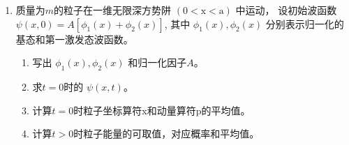 
\begin{enumerate}
	\item
	质量为$ m $的粒子在一维无限深方势阱 $(0<\mathrm{x}<\mathrm{a})$ 中运动， 设初始波函数 $\psi(x, 0)=A\left[\phi_{1}(x)+\phi_{2}(x)\right]$, 其中 $\phi_{1}(x), \phi_{2}(x)$ 分别表示归一化的基态和第一激发态波函数。
	\begin{enumerate}
		\item
		写出 $\phi_{1}(x), \phi_{2}(x)$ 和归一化因子$ A $。
		\item 
		求$ t=0 $时的 $\psi(x, t)$。
		\item 
		计算$ t=0 $时粒子坐标算符x和动量算符p的平均值。
		\item 
		计算$ t>0 $时粒子能量的可取值，对应概率和平均值。
		
		
		
	\end{enumerate}
	
	\banswer{
		
	}
	

\end{enumerate}
